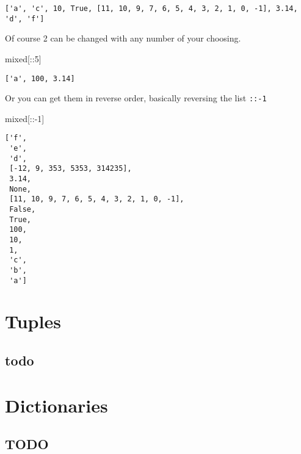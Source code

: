 \documentclass[
  letterpaper,
  DIV=11,
  numbers=noendperiod]{scrreprt}
\newenvironment{Shaded}{\begin{snugshade}}{\end{snugshade}}
\newcommand{\DecValTok}[1]{\textcolor[rgb]{0.68,0.00,0.00}{#1}}
\newcommand{\NormalTok}[1]{\textcolor[rgb]{0.00,0.23,0.31}{#1}}
\newcommand{\OperatorTok}[1]{\textcolor[rgb]{0.37,0.37,0.37}{#1}}
\begin{document}
\begin{verbatim}
['a', 'c', 10, True, [11, 10, 9, 7, 6, 5, 4, 3, 2, 1, 0, -1], 3.14, 'd', 'f']
\end{verbatim}

Of course 2 can be changed with any number of your choosing.

\begin{Shaded}
\begin{Highlighting}[]
\NormalTok{mixed[::}\DecValTok{5}\NormalTok{]}
\end{Highlighting}
\end{Shaded}

\begin{verbatim}
['a', 100, 3.14]
\end{verbatim}

Or you can get them in reverse order, basically reversing the list
\texttt{::-1}

\begin{Shaded}
\begin{Highlighting}[]
\NormalTok{mixed[::}\OperatorTok{{-}}\DecValTok{1}\NormalTok{]}
\end{Highlighting}
\end{Shaded}

\begin{verbatim}
['f',
 'e',
 'd',
 [-12, 9, 353, 5353, 314235],
 3.14,
 None,
 [11, 10, 9, 7, 6, 5, 4, 3, 2, 1, 0, -1],
 False,
 True,
 100,
 10,
 1,
 'c',
 'b',
 'a']
\end{verbatim}

\chapter{Tuples}\label{tuples}

\section{todo}\label{todo}

\chapter{Dictionaries}\label{dictionaries}

\section{TODO}\label{todo-1}
\end{document}
